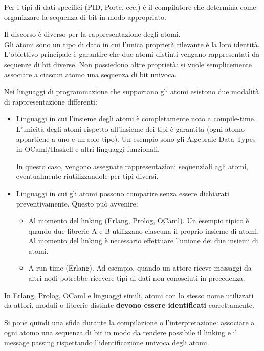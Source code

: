 \documentclass{article}
\begin{document}
Per i tipi di dati specifici (PID, Porte, ecc.) è il compilatore che determina come organizzare la sequenza di bit in modo appropriato.

Il discorso è diverso per la rappresentazione degli atomi.\\
Gli atomi sono un tipo di dato in cui l'unica proprietà rilevante è la loro identità. L'obiettivo principale è garantire che due atomi distinti vengano rappresentati da sequenze di bit diverse.
Non possiedono altre proprietà: si vuole semplicemente associare a ciascun atomo una sequenza di bit univoca.

Nei linguaggi di programmazione che supportano gli atomi esistono due modalità di rappresentazione differenti:
\begin{itemize}
    \item Linguaggi in cui l'insieme degli atomi è completamente noto a compile-time. L'unicità degli atomi rispetto all'insieme dei tipi è garantita (ogni atomo appartiene a uno e un solo tipo). Un esempio sono gli Algebraic Data Types in OCaml/Haskell e altri linguaggi funzionali.
    
    In questo caso, vengono assegnate rappresentazioni sequenziali agli atomi, eventualmente riutilizzandole per tipi diversi.
    \item Linguaggi in cui gli atomi possono comparire senza essere dichiarati preventivamente. Questo può avvenire:
    \begin{itemize}
        \item Al momento del linking (Erlang, Prolog, OCaml). Un esempio tipico è quando due librerie A e B utilizzano ciascuna il proprio insieme di atomi. Al momento del linking è necessario effettuare l'unione dei due insiemi di atomi.
        \item A run-time (Erlang). Ad esempio, quando un attore riceve messaggi da altri nodi potrebbe ricevere tipi di dati non conosciuti in precedenza.
    \end{itemize}
\end{itemize}

In Erlang, Prolog, OCaml e linguaggi simili, atomi con lo stesso nome utilizzati da attori, moduli o librerie distinte \textbf{devono essere identificati} correttamente.

Si pone quindi una sfida durante la compilazione o l'interpretazione: associare a ogni atomo una sequenza di bit in modo da rendere possibile il linking e il message passing rispettando l'identificazione univoca degli atomi.
\end{document}
